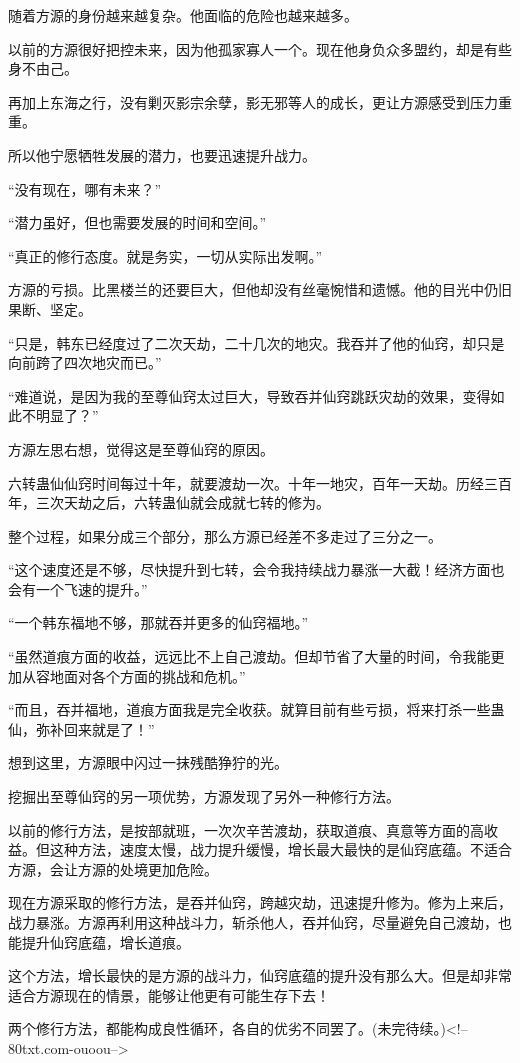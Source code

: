 \begin{this_body}
随着方源的身份越来越复杂。他面临的危险也越来越多。

以前的方源很好把控未来，因为他孤家寡人一个。现在他身负众多盟约，却是有些身不由己。

再加上东海之行，没有剿灭影宗余孽，影无邪等人的成长，更让方源感受到压力重重。

所以他宁愿牺牲发展的潜力，也要迅速提升战力。

“没有现在，哪有未来？”

“潜力虽好，但也需要发展的时间和空间。”

“真正的修行态度。就是务实，一切从实际出发啊。”

方源的亏损。比黑楼兰的还要巨大，但他却没有丝毫惋惜和遗憾。他的目光中仍旧果断、坚定。

“只是，韩东已经度过了二次天劫，二十几次的地灾。我吞并了他的仙窍，却只是向前跨了四次地灾而已。”

“难道说，是因为我的至尊仙窍太过巨大，导致吞并仙窍跳跃灾劫的效果，变得如此不明显了？”

方源左思右想，觉得这是至尊仙窍的原因。

六转蛊仙仙窍时间每过十年，就要渡劫一次。十年一地灾，百年一天劫。历经三百年，三次天劫之后，六转蛊仙就会成就七转的修为。

整个过程，如果分成三个部分，那么方源已经差不多走过了三分之一。

“这个速度还是不够，尽快提升到七转，会令我持续战力暴涨一大截！经济方面也会有一个飞速的提升。”

“一个韩东福地不够，那就吞并更多的仙窍福地。”

“虽然道痕方面的收益，远远比不上自己渡劫。但却节省了大量的时间，令我能更加从容地面对各个方面的挑战和危机。”

“而且，吞并福地，道痕方面我是完全收获。就算目前有些亏损，将来打杀一些蛊仙，弥补回来就是了！”

想到这里，方源眼中闪过一抹残酷狰狞的光。

挖掘出至尊仙窍的另一项优势，方源发现了另外一种修行方法。

以前的修行方法，是按部就班，一次次辛苦渡劫，获取道痕、真意等方面的高收益。但这种方法，速度太慢，战力提升缓慢，增长最大最快的是仙窍底蕴。不适合方源，会让方源的处境更加危险。

现在方源采取的修行方法，是吞并仙窍，跨越灾劫，迅速提升修为。修为上来后，战力暴涨。方源再利用这种战斗力，斩杀他人，吞并仙窍，尽量避免自己渡劫，也能提升仙窍底蕴，增长道痕。

这个方法，增长最快的是方源的战斗力，仙窍底蕴的提升没有那么大。但是却非常适合方源现在的情景，能够让他更有可能生存下去！

两个修行方法，都能构成良性循环，各自的优劣不同罢了。(未完待续。)<!--80txt.com-ouoou-->

\end{this_body}

